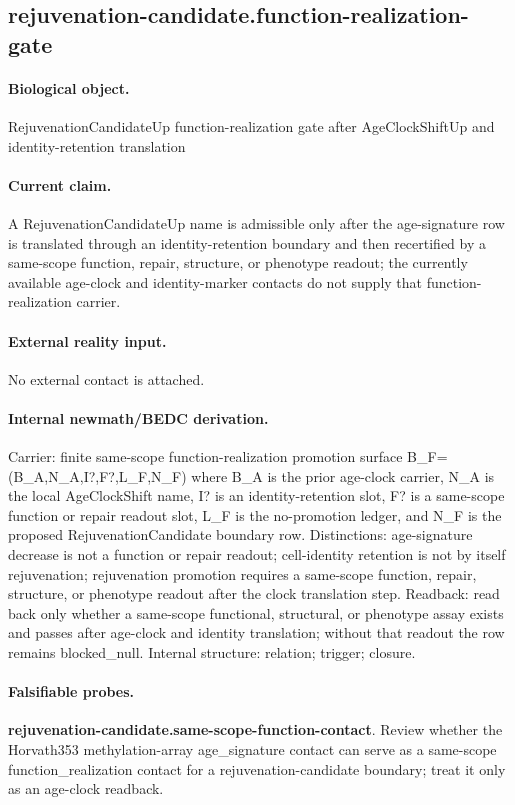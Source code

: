 \subsection{rejuvenation-candidate.function-realization-gate}

\paragraph{Biological object.} RejuvenationCandidateUp function-realization gate after AgeClockShiftUp and identity-retention translation

\paragraph{Current claim.} A RejuvenationCandidateUp name is admissible only after the age-signature row is translated through an identity-retention boundary and then recertified by a same-scope function, repair, structure, or phenotype readout; the currently available age-clock and identity-marker contacts do not supply that function-realization carrier.

\paragraph{External reality input.}
No external contact is attached.

\paragraph{Internal newmath/BEDC derivation.} Carrier: finite same-scope function-realization promotion surface B\_F=(B\_A,N\_A,I?,F?,L\_F,N\_F) where B\_A is the prior age-clock carrier, N\_A is the local AgeClockShift name, I? is an identity-retention slot, F? is a same-scope function or repair readout slot, L\_F is the no-promotion ledger, and N\_F is the proposed RejuvenationCandidate boundary row. Distinctions: age-signature decrease is not a function or repair readout; cell-identity retention is not by itself rejuvenation; rejuvenation promotion requires a same-scope function, repair, structure, or phenotype readout after the clock translation step. Readback: read back only whether a same-scope functional, structural, or phenotype assay exists and passes after age-clock and identity translation; without that readout the row remains blocked\_null. Internal structure: relation; trigger; closure.

\paragraph{Falsifiable probes.}
\textbf{rejuvenation-candidate.same-scope-function-contact}. Review whether the Horvath353 methylation-array age\_signature contact can serve as a same-scope function\_realization contact for a rejuvenation-candidate boundary; treat it only as an age-clock readback.


